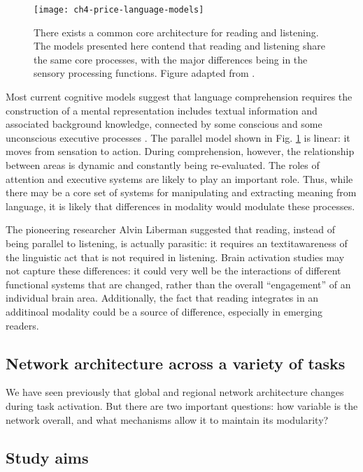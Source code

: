 \begin{figure}[t]
	\centering
	\texttt{[image: ch4-price-language-models]}
    \caption[Common core architecture for reading and listening.]{There exists a common core architecture for reading and listening. The models presented here contend that reading and listening share the same core processes, with the major differences being in the sensory processing functions. Figure adapted from \citep{Price2012}.}
	\label{fig:ch4-price-language-models}
\end{figure}

Most current cognitive models suggest that language comprehension requires the construction of a mental representation includes textual information and associated background knowledge, connected by some conscious and some unconscious executive processes \citep{Kendeou2014}. The parallel model shown in Fig. \ref{fig:ch4-price-language-models} is linear: it moves from sensation to action. During comprehension, however, the relationship between areas is dynamic and constantly being re-evaluated. The roles of attention and executive systems are likely to play an important role. Thus, while there may be a core set of systems for manipulating and extracting meaning from language, it is likely that differences in modality would modulate these processes. 

The pioneering researcher Alvin Liberman suggested that reading, instead of being parallel to listening, is actually parasitic: it requires an textit{awareness} of the linguistic act that is not required in listening. Brain activation studies may not capture these differences: it could very well be the interactions of different functional systems that are changed, rather than the overall ``engagement'' of an individual brain area. Additionally, the fact that reading integrates in an additinoal modality could be a source of difference, especially in emerging readers. 

\subsection{Network architecture across a variety of tasks}

We have seen previously that global and regional network architecture changes during task activation. But there are two important questions: how variable is the network overall, and what mechanisms allow it to maintain its modularity?

\subsection{Study aims}

